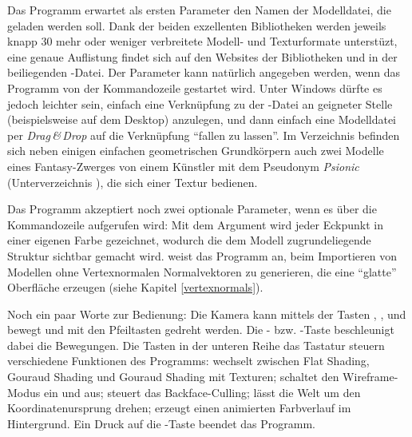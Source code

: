 Das Programm erwartet als ersten Parameter den Namen der Modelldatei, die geladen werden soll. Dank der beiden exzellenten Bibliotheken werden jeweils knapp 30 mehr oder weniger verbreitete Modell- und Texturformate unterstüzt, eine genaue Auflistung findet sich auf den Websites der Bibliotheken und in der beiliegenden -Datei. Der Parameter kann natürlich angegeben werden, wenn das Programm von der Kommandozeile gestartet wird. Unter Windows dürfte es jedoch leichter sein, einfach eine Verknüpfung zu der -Datei an geigneter Stelle (beispielsweise auf dem Desktop) anzulegen, und dann einfach eine Modelldatei per \emph{Drag\,\&\,Drop} auf die Verknüpfung \enquote{fallen zu lassen}. Im Verzeichnis  befinden sich neben einigen einfachen geometrischen Grundkörpern auch zwei Modelle eines Fantasy-Zwerges von einem Künstler mit dem Pseudonym \emph{Psionic} (Unterverzeichnis ), die sich einer Textur bedienen.

Das Programm akzeptiert noch zwei optionale Parameter, wenn es über die Kommandozeile aufgerufen wird: Mit dem Argument  wird jeder Eckpunkt in einer eigenen Farbe gezeichnet, wodurch die dem Modell zugrundeliegende Struktur sichtbar gemacht wird.  weist das Programm an, beim Importieren von Modellen ohne Vertexnormalen Normalvektoren zu generieren, die eine \enquote{glatte} Oberfläche erzeugen (siehe Kapitel \ref{vertexnormals}).

Noch ein paar Worte zur Bedienung: Die Kamera kann mittels der Tasten , ,  und  bewegt und mit den Pfeiltasten gedreht werden. Die - bzw. -Taste beschleunigt dabei die Bewegungen. Die Tasten in der unteren Reihe das Tastatur steuern verschiedene Funktionen des Programms:  wechselt zwischen Flat Shading, Gouraud Shading und Gouraud Shading mit Texturen;  schaltet den Wireframe-Modus ein und aus;  steuert das Backface-Culling;  lässt die Welt um den Koordinatenursprung drehen;  erzeugt einen animierten Farbverlauf im Hintergrund. Ein Druck auf die -Taste beendet das Programm.